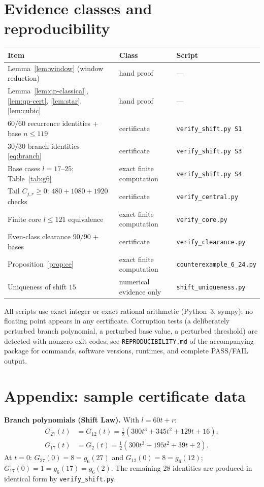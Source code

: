 \documentclass[11pt,reqno]{article}
\theoremstyle{definition}
\begin{document}
\section{Evidence classes and reproducibility}\label{sec:status}
\begin{center}\footnotesize
\begin{tabular}{p{}lp{}}
\toprule
Item & Class & Script \\
\midrule
Lemma~\ref{lem:window} (window reduction) & hand proof & --- \\
Lemma~\ref{lem:qp-classical}, \ref{lem:qp-cert}, \ref{lem:star}, \ref{lem:cubic} & hand proof & --- \\
$60/60$ recurrence identities + base $n\le119$ & certificate & \texttt{verify\_shift.py S1} \\
$30/30$ branch identities \eqref{eq:branch} & certificate & \texttt{verify\_shift.py S3} \\
Base cases $l=17$--$25$; Table~\ref{tab:g6} & exact finite computation & \texttt{verify\_shift.py S4} \\
Tail $C_{j,r}\ge0$: $480{+}1080{+}1920$ checks & certificate & \texttt{verify\_central.py} \\
Finite core $l\le121$ equivalence & exact finite computation & \texttt{verify\_core.py} \\
Even-class clearance $90/90$ + bases & certificate & \texttt{verify\_clearance.py} \\
Proposition~\ref{prop:ce} & exact finite computation & \texttt{counterexample\_6\_\allowbreak 24.py} \\
Uniqueness of shift $15$ & numerical evidence only & \texttt{shift\_uniqueness.py} \\
\bottomrule
\end{tabular}
\end{center}
All scripts use exact integer or exact rational arithmetic (Python~3, sympy); no floating point appears in any certificate. Corruption tests (a deliberately perturbed branch polynomial, a perturbed base value, a perturbed threshold) are detected with nonzero exit codes; see \texttt{REPRODUCIBILITY.md} of the accompanying package for commands, software versions, runtimes, and complete PASS/FAIL output.

\section{Appendix: sample certificate data}\label{app:cert}
\textbf{Branch polynomials (Shift Law).} With $l=60t+r$:
\begin{align*}
G_{27}(t)&=G_{12}(t)=\tfrac{1}{2}\left(300t^3+345t^2+129t+16\right),\\
G_{17}(t)&=G_{2}(t)=\tfrac{1}{2}\left(300t^3+195t^2+39t+2\right).
\end{align*}
At $t=0$: $G_{27}(0)=8=g_6(27)$ and $G_{12}(0)=8=g_6(12)$; $G_{17}(0)=1=g_6(17)=g_6(2)$. The remaining $28$ identities are produced in identical form by \texttt{verify\_shift.py}.
\end{document}
